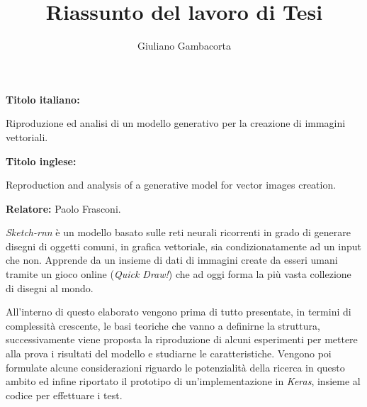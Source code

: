 \documentclass[a4paper, 12pt]{article}
\author{Giuliano Gambacorta}
\title{Riassunto del lavoro di Tesi}
\date{}
\begin{document}
\maketitle
\begin{center}
	\textbf{Titolo italiano:} 

	Riproduzione ed analisi di un modello generativo per la creazione di immagini vettoriali.
	
	\vspace{2mm}
	
	\textbf{Titolo inglese:}

	Reproduction and analysis of a generative model for vector images creation.
	
	\vspace{2mm}
	
	\textbf{Relatore:} Paolo Frasconi.
\end{center}

\vspace{5mm}

\textit{Sketch-rnn} è un modello basato sulle reti neurali ricorrenti in grado di generare disegni di oggetti comuni, in grafica vettoriale, sia condizionatamente ad un input che non. Apprende da un insieme di dati di immagini create da esseri umani tramite un gioco online (\textit{Quick Draw!}) che ad oggi forma la più vasta collezione di disegni al mondo. 

All'interno di questo elaborato vengono prima di tutto presentate, in termini di complessità crescente, le basi teoriche che vanno a definirne la struttura, successivamente viene proposta la riproduzione di alcuni esperimenti per mettere alla prova i risultati del modello e studiarne le caratteristiche. Vengono poi formulate alcune considerazioni riguardo le potenzialità della ricerca in questo ambito ed infine riportato il prototipo di un'implementazione in \textit{Keras}, insieme al codice per effettuare i test.
\end{document}
